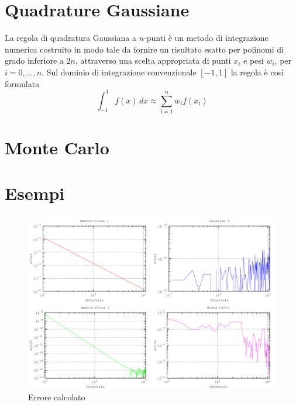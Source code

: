 \section{Quadrature Gaussiane}
La regola di quadratura Gaussiana a $n$-punti è un metodo di integrazione numerica costruito in modo tale da fornire un risultato esatto per polinomi di grado inferiore a $2n$, attraverso una scelta appropriata di punti $x_i$ e pesi $w_i$, per $i=0,...,n$. Sul dominio di integrazione convenzionale $[-1,1]$ la regola è così formulata
$$\int_{-1}^1 f(x)\,dx \approx \sum_{i=1}^n w_i f(x_i)$$


\section{Monte Carlo}

\section{Esempi}
\begin{figure}[h]
\centering
\includegraphics[width=\textwidth]{integral}
\caption{Errore calcolato}
\label{fig:integral}
\end{figure}

